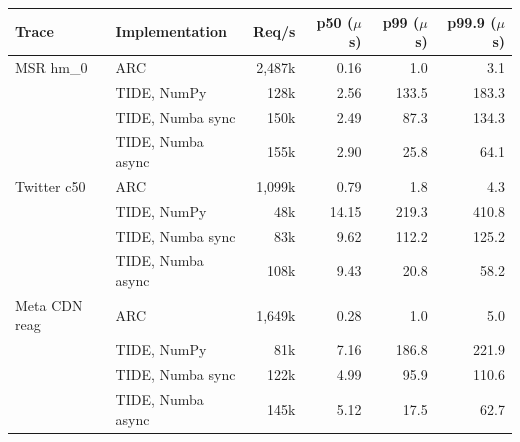 \begin{tabular}{llrrrr}
\toprule
Trace & Implementation & Req/s & p50 ($\mu$s) & p99 ($\mu$s) & p99.9 ($\mu$s) \\
\midrule
MSR hm\_0 & ARC & 2,487k & 0.16 & 1.0 & 3.1 \\
 & TIDE, NumPy & 128k & 2.56 & 133.5 & 183.3 \\
 & TIDE, Numba sync & 150k & 2.49 & 87.3 & 134.3 \\
 & TIDE, Numba async & 155k & 2.90 & 25.8 & 64.1 \\
\midrule
Twitter c50 & ARC & 1,099k & 0.79 & 1.8 & 4.3 \\
 & TIDE, NumPy & 48k & 14.15 & 219.3 & 410.8 \\
 & TIDE, Numba sync & 83k & 9.62 & 112.2 & 125.2 \\
 & TIDE, Numba async & 108k & 9.43 & 20.8 & 58.2 \\
\midrule
Meta CDN reag & ARC & 1,649k & 0.28 & 1.0 & 5.0 \\
 & TIDE, NumPy & 81k & 7.16 & 186.8 & 221.9 \\
 & TIDE, Numba sync & 122k & 4.99 & 95.9 & 110.6 \\
 & TIDE, Numba async & 145k & 5.12 & 17.5 & 62.7 \\
\bottomrule
\end{tabular}
